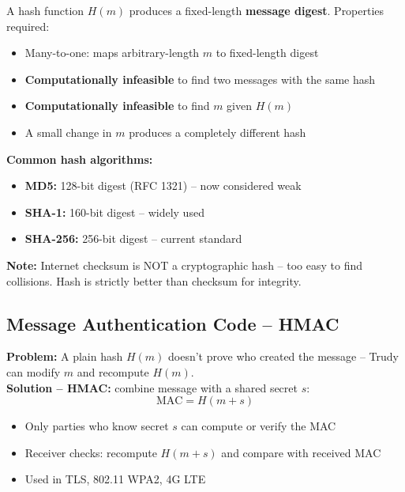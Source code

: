 \begin{tcolorbox}[keybox, title=Cryptographic Hash Functions]
A hash function $H(m)$ produces a fixed-length \textbf{message digest}. Properties required:
\begin{itemize}[noitemsep]
  \item Many-to-one: maps arbitrary-length $m$ to fixed-length digest
  \item \textbf{Computationally infeasible} to find two messages with the same hash
  \item \textbf{Computationally infeasible} to find $m$ given $H(m)$
  \item A small change in $m$ produces a completely different hash
\end{itemize}
\textbf{Common hash algorithms:}
\begin{itemize}[noitemsep]
  \item \textbf{MD5:} 128-bit digest (RFC 1321) -- now considered weak
  \item \textbf{SHA-1:} 160-bit digest -- widely used
  \item \textbf{SHA-256:} 256-bit digest -- current standard
\end{itemize}
\textbf{Note:} Internet checksum is NOT a cryptographic hash -- too easy to find collisions. Hash is strictly better than checksum for integrity.
\end{tcolorbox}

\subsection{Message Authentication Code -- HMAC}

\begin{tcolorbox}[keybox, title=HMAC -- Hash-based Message Authentication Code]
\textbf{Problem:} A plain hash $H(m)$ doesn't prove who created the message -- Trudy can modify $m$ and recompute $H(m)$.\\[4pt]
\textbf{Solution -- HMAC:} combine message with a shared secret $s$:
\[ \text{MAC} = H(m + s) \]
\begin{itemize}[noitemsep]
  \item Only parties who know secret $s$ can compute or verify the MAC
  \item Receiver checks: recompute $H(m+s)$ and compare with received MAC
  \item Used in TLS, 802.11 WPA2, 4G LTE
\end{itemize}
\end{tcolorbox}

